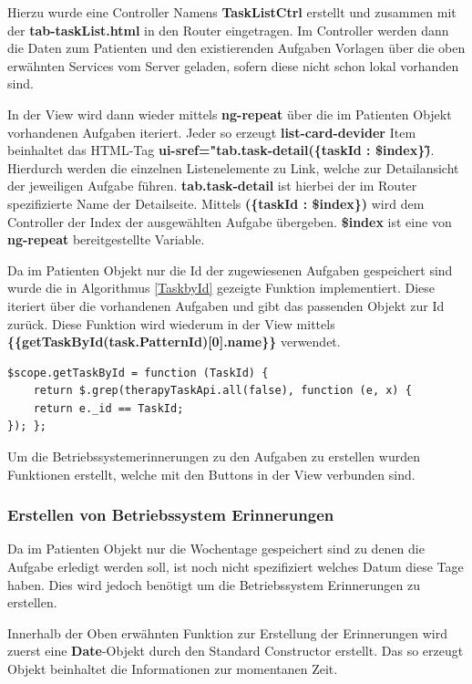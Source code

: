 Hierzu wurde eine Controller Namens \textbf{TaskListCtrl} erstellt und zusammen mit der \textbf{tab-taskList.html} in den Router eingetragen. Im Controller werden dann die Daten zum Patienten und den existierenden Aufgaben Vorlagen über die oben erwähnten Services vom Server geladen, sofern diese nicht schon lokal vorhanden sind.

In der View wird dann wieder mittels \textbf{ng-repeat} über die im Patienten Objekt vorhandenen Aufgaben iteriert. Jeder so erzeugt \textbf{list-card-devider} Item beinhaltet das HTML-Tag \textbf{ui-sref="tab.task-detail(\{taskId : \$index\})\"}. Hierdurch werden die einzelnen Listenelemente zu Link, welche zur Detailansicht der jeweiligen Aufgabe führen. \textbf{tab.task-detail} ist hierbei der im Router spezifizierte Name der Detailseite. Mittels \textbf{(\{taskId : \$index\})} wird dem Controller der Index der ausgewählten Aufgabe übergeben.
\textbf{\$index} ist eine von \textbf{ng-repeat} bereitgestellte Variable.

Da im Patienten Objekt nur die Id der zugewiesenen Aufgaben gespeichert sind wurde die in Algorithmus \ref{TaskbyId} gezeigte Funktion implementiert. Diese iteriert über die vorhandenen Aufgaben und gibt das passenden Objekt zur Id zurück. Diese Funktion wird wiederum in der View mittels \textbf{\{\{getTaskById(task.PatternId)[0].name\}\}} verwendet.

\begin{lstlisting}[caption={Funktion welche den Namen einer Aufgabe abhängig von der Id zurückliefert},label=TaskbyId]
$scope.getTaskById = function (TaskId) {
	return $.grep(therapyTaskApi.all(false), function (e, x) {
	return e._id == TaskId; 
}); };
\end{lstlisting}
Um die Betriebssystemerinnerungen zu den Aufgaben zu erstellen wurden Funktionen erstellt, welche mit den Buttons in der View verbunden sind.

\subsubsection{Erstellen von Betriebssystem Erinnerungen}\label{notifications}
Da im Patienten Objekt nur die Wochentage gespeichert sind zu denen die Aufgabe erledigt werden soll, ist noch nicht spezifiziert welches Datum diese Tage haben. Dies wird jedoch benötigt um die Betriebssystem Erinnerungen zu erstellen.

Innerhalb der Oben erwähnten Funktion zur Erstellung der Erinnerungen wird zuerst eine \textbf{Date}-Objekt durch den Standard Constructor erstellt. Das so erzeugt Objekt beinhaltet die Informationen zur momentanen Zeit.

